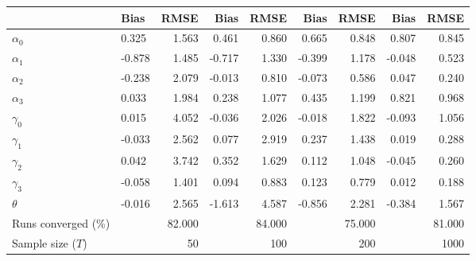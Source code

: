 
\begin{tabular}[t]{llrrrrrrr}
\toprule
  & Bias & RMSE & Bias & RMSE & Bias & RMSE & Bias & RMSE\\
\midrule
$\alpha_{0}$ & 0.325 & 1.563 & 0.461 & 0.860 & 0.665 & 0.848 & 0.807 & 0.845\\
$\alpha_{1}$ & -0.878 & 1.485 & -0.717 & 1.330 & -0.399 & 1.178 & -0.048 & 0.523\\
$\alpha_{2}$ & -0.238 & 2.079 & -0.013 & 0.810 & -0.073 & 0.586 & 0.047 & 0.240\\
$\alpha_{3}$ & 0.033 & 1.984 & 0.238 & 1.077 & 0.435 & 1.199 & 0.821 & 0.968\\
$\gamma_{0}$ & 0.015 & 4.052 & -0.036 & 2.026 & -0.018 & 1.822 & -0.093 & 1.056\\
$\gamma_{1}$ & -0.033 & 2.562 & 0.077 & 2.919 & 0.237 & 1.438 & 0.019 & 0.288\\
$\gamma_{2}$ & 0.042 & 3.742 & 0.352 & 1.629 & 0.112 & 1.048 & -0.045 & 0.260\\
$\gamma_{3}$ & -0.058 & 1.401 & 0.094 & 0.883 & 0.123 & 0.779 & 0.012 & 0.188\\
$\theta$ & -0.016 & 2.565 & -1.613 & 4.587 & -0.856 & 2.281 & -0.384 & 1.567\\
Runs converged (\%) &  & 82.000 &  & 84.000 &  & 75.000 &  & 81.000\\
Sample size ($T$) &  & 50 &  & 100 &  & 200 &  & 1000\\
\bottomrule
\end{tabular}
